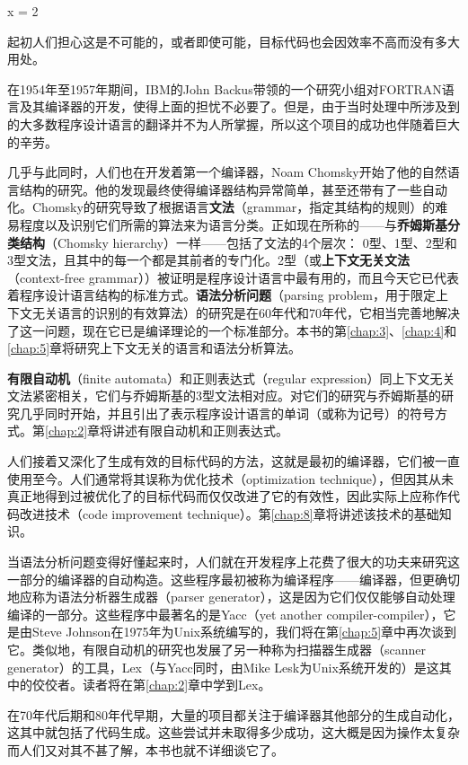 \documentclass[lang=cn,10pt]{elegantbook}
\begin{document}
x = 2

起初人们担心这是不可能的，或者即使可能，目标代码也会因效率不高而没有多大用处。

在1954年至1957年期间，IBM的John Backus带领的一个研究小组对FORTRAN语言及其编译器的开发，使得上面的担忧不必要了。但是，由于当时处理中所涉及到的大多数程序设计语言的翻译并不为人所掌握，所以这个项目的成功也伴随着巨大的辛劳。

几乎与此同时，人们也在开发着第一个编译器，Noam Chomsky开始了他的自然语言结构的研究。他的发现最终使得编译器结构异常简单，甚至还带有了一些自动化。Chomsky的研究导致了根据语言\textbf{文法}（grammar，指定其结构的规则）的难易程度以及识别它们所需的算法来为语言分类。正如现在所称的——与\textbf{乔姆斯基分类结构}（Chomsky hierarchy）一样——包括了文法的4个层次： 0型、1型、2型和3型文法，且其中的每一个都是其前者的专门化。2型（或\textbf{上下文无关文法}（context-free grammar））被证明是程序设计语言中最有用的，而且今天它已代表着程序设计语言结构的标准方式。\textbf{语法分析问题}（parsing problem，用于限定上下文无关语言的识别的有效算法）的研究是在60年代和70年代，它相当完善地解决了这一问题，现在它已是编译理论的一个标准部分。本书的第\ref{chap:3}、\ref{chap:4}和\ref{chap:5}章将研究上下文无关的语言和语法分析算法。

\textbf{有限自动机}（finite automata）和正则表达式（regular expression）同上下文无关文法紧密相关，它们与乔姆斯基的3型文法相对应。对它们的研究与乔姆斯基的研究几乎同时开始，并且引出了表示程序设计语言的单词（或称为记号）的符号方式。第\ref{chap:2}章将讲述有限自动机和正则表达式。

人们接着又深化了生成有效的目标代码的方法，这就是最初的编译器，它们被一直使用至今。人们通常将其误称为优化技术（optimization technique），但因其从未真正地得到过被优化了的目标代码而仅仅改进了它的有效性，因此实际上应称作代码改进技术（code improvement technique）。第\ref{chap:8}章将讲述该技术的基础知识。

当语法分析问题变得好懂起来时，人们就在开发程序上花费了很大的功夫来研究这一部分的编译器的自动构造。这些程序最初被称为编译程序——编译器，但更确切地应称为语法分析器生成器（parser generator），这是因为它们仅仅能够自动处理编译的一部分。这些程序中最著名的是Yacc（yet another compiler-compiler），它是由Steve Johnson在1975年为Unix系统编写的，我们将在第\ref{chap:5}章中再次谈到它。类似地，有限自动机的研究也发展了另一种称为扫描器生成器（scanner generator）的工具，Lex（与Yacc同时，由Mike Lesk为Unix系统开发的）是这其中的佼佼者。读者将在第\ref{chap:2}章中学到Lex。

在70年代后期和80年代早期，大量的项目都关注于编译器其他部分的生成自动化，这其中就包括了代码生成。这些尝试并未取得多少成功，这大概是因为操作太复杂而人们又对其不甚了解，本书也就不详细谈它了。
\end{document}
